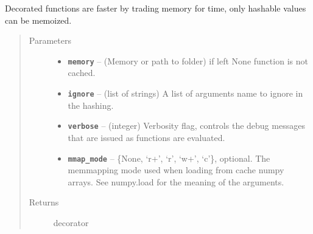 \documentclass[letterpaper,10pt,english]{sphinxmanual}
\begin{document}
\begin{fulllineitems}
\begin{fulllineitems}
\end{fulllineitems}


\begin{fulllineitems}
\label{RRtoolbox.lib:RRtoolbox.lib.cache.Memoizer.memoize}
Decorated functions are faster by trading memory for time, only hashable values can be memoized.
\begin{quote}\begin{description}
\item[{Parameters}] \leavevmode\begin{itemize}
\item {} 
\textbf{\texttt{memory}} -- (Memory or path to folder) if left None function is not cached.

\item {} 
\textbf{\texttt{ignore}} -- (list of strings) A list of arguments name to ignore in the hashing.

\item {} 
\textbf{\texttt{verbose}} -- (integer) Verbosity flag, controls the debug messages that are issued as functions are evaluated.

\item {} 
\textbf{\texttt{mmap\_mode}} -- \{None, `r+', `r', `w+', `c'\}, optional. The memmapping mode used when loading from cache
numpy arrays. See numpy.load for the meaning of the arguments.

\end{itemize}

\item[{Returns}] \leavevmode
decorator

\end{description}\end{quote}

\end{fulllineitems}


\begin{fulllineitems}
\label{RRtoolbox.lib:RRtoolbox.lib.cache.Memoizer.memoizers}
\end{fulllineitems}


\end{fulllineitems}
\end{document}
